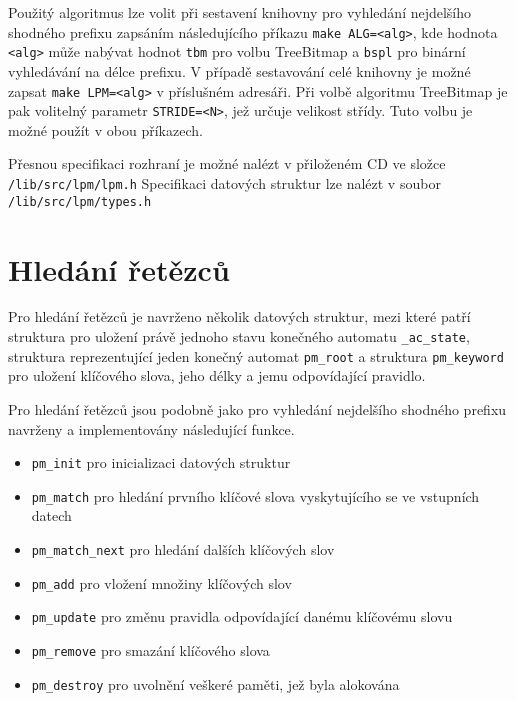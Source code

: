 Použitý algoritmus lze volit při sestavení knihovny pro vyhledání nejdelšího shodného prefixu
zapsáním následujícího příkazu \texttt{make ALG=<alg>}, kde hodnota \texttt{<alg>} může nabývat
hodnot \texttt{tbm} pro volbu TreeBitmap a \texttt{bspl} pro binární vyhledávání na délce prefixu.
V případě sestavování celé knihovny je možné zapsat \texttt{make LPM=<alg>} v příslušném adresáři.
Při volbě algoritmu TreeBitmap je pak volitelný parametr \texttt{STRIDE=<N>}, jež určuje velikost
střídy. Tuto volbu je možné použít v obou příkazech.

Přesnou specifikaci rozhraní je možné nalézt v přiloženém CD ve složce \texttt{/lib/src/lpm/lpm.h}
Specifikaci datových struktur lze nalézt v soubor \texttt{/lib/src/lpm/types.h}


\section{Hledání řetězců}\label{api:pm} %

Pro hledání řetězců je navrženo několik datových struktur, mezi které patří
struktura pro uložení právě jednoho stavu konečného automatu \texttt{\_ac\_state},
struktura reprezentující jeden konečný automat \texttt{pm\_root} a struktura \texttt{pm\_keyword}
pro uložení klíčového slova, jeho délky a jemu odpovídající pravidlo.


Pro hledání řetězců jsou podobně jako pro vyhledání nejdelšího shodného prefixu navrženy a implementovány
následující funkce.

\begin{itemize}
    \item{\texttt{pm\_init} pro inicializaci datových struktur}
    \item{\texttt{pm\_match} pro hledání prvního klíčové slova vyskytujícího se ve vstupních datech}
    \item{\texttt{pm\_match\_next} pro hledání dalších klíčových slov}
    \item{\texttt{pm\_add} pro vložení množiny klíčových slov}
    \item{\texttt{pm\_update} pro změnu pravidla odpovídající danému klíčovému slovu}
    \item{\texttt{pm\_remove} pro smazání klíčového slova}
    \item{\texttt{pm\_destroy} pro uvolnění veškeré paměti, jež byla alokována}
\end{itemize}

